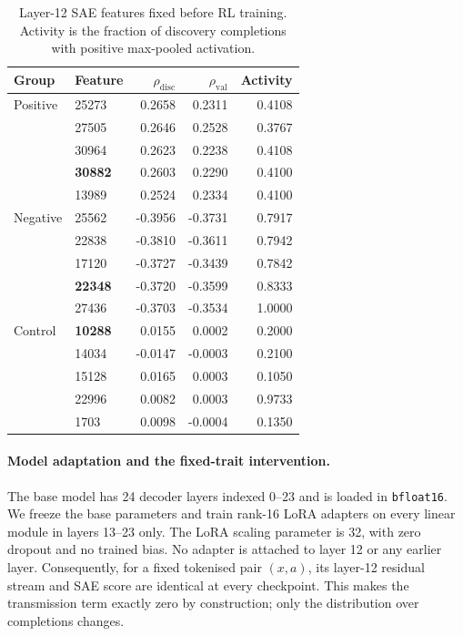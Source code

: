 \begin{table}[t]
\centering
\small
\begin{tabular}{llrrr}
\hline
Group & Feature & $\rho_{\mathrm{disc}}$ & $\rho_{\mathrm{val}}$ & Activity \\
\hline
Positive & 25273 &  0.2658 &  0.2311 & 0.4108 \\
         & 27505 &  0.2646 &  0.2528 & 0.3767 \\
         & 30964 &  0.2623 &  0.2238 & 0.4108 \\
         & \textbf{30882} &  0.2603 &  0.2290 & 0.4100 \\
         & 13989 &  0.2524 &  0.2334 & 0.4100 \\
\hline
Negative & 25562 & -0.3956 & -0.3731 & 0.7917 \\
         & 22838 & -0.3810 & -0.3611 & 0.7942 \\
         & 17120 & -0.3727 & -0.3439 & 0.7842 \\
         & \textbf{22348} & -0.3720 & -0.3599 & 0.8333 \\
         & 27436 & -0.3703 & -0.3534 & 1.0000 \\
\hline
Control  & \textbf{10288} &  0.0155 &  0.0002 & 0.2000 \\
         & 14034 & -0.0147 & -0.0003 & 0.2100 \\
         & 15128 &  0.0165 &  0.0003 & 0.1050 \\
         & 22996 &  0.0082 &  0.0003 & 0.9733 \\
         & 1703  &  0.0098 & -0.0004 & 0.1350 \\
\hline
\end{tabular}
\caption{Layer-12 SAE features fixed before RL training. Activity is the
fraction of discovery completions with positive max-pooled activation.}
\label{tab:activation-features}
\end{table}

\paragraph{Model adaptation and the fixed-trait intervention.}
The base model has 24 decoder layers indexed 0--23 and is loaded in
\texttt{bfloat16}.  We freeze the base parameters and train rank-16 LoRA
adapters on every linear module in layers 13--23 only.  The LoRA scaling
parameter is 32, with zero dropout and no trained bias.  No adapter is
attached to layer 12 or any earlier layer.  Consequently, for a fixed
tokenised pair $(x,a)$, its layer-12 residual stream and SAE score are
identical at every checkpoint.  This makes the transmission term exactly
zero by construction; only the distribution over completions changes.

